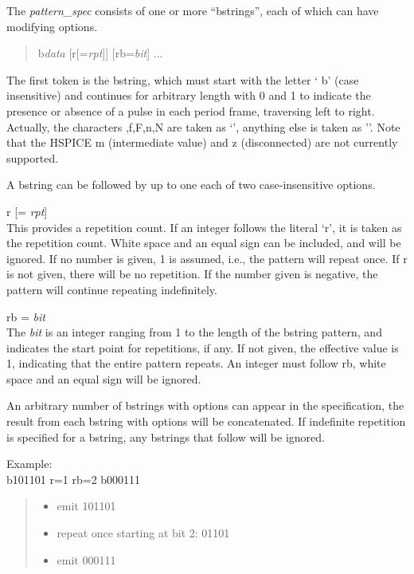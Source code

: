 The {\it pattern\_spec} consists of one or more ``bstrings'', each of
which can have modifying options.

\begin{quote}
{\vt b}{\it data} [{\vt r}[{\vt =}{\it rpt\/}]] [{\vt rb}{\vt =}{\it bit\/}] ...
\end{quote}

The first token is the bstring, which must start with the letter `{\vt
b}' (case insensitive) and continues for arbitrary length with 0 and 1
to indicate the presence or absence of a pulse in each period frame,
traversing left to right.  Actually, the characters {,f,F,n,N}
are taken as `{}', anything else is taken as '{}'.  Note
that the HSPICE {\vt m} (intermediate value) and {\vt z}
(disconnected) are not currently supported.

A bstring can be followed by up to one each of two case-insensitive
options.
\begin{description}
\item{\vt r} [{\vt =} {\it rpt\/}]\\
This provides a repetition count.  If an integer follows the literal
`{\vt r}', it is taken as the repetition count.  White space and an
equal sign can be included, and will be ignored.  If no number is
given, 1 is assumed, i.e., the pattern will repeat once.  If {\vt r}
is not given, there will be no repetition.  If the number given is
negative, the pattern will continue repeating indefinitely.

\item{rb} {\vt =} {\it bit\/}\\
The {\it bit} is an integer ranging from 1 to the length of the
bstring pattern, and indicates the start point for repetitions, if
any.  If not given, the effective value is 1, indicating that the
entire pattern repeats.  An integer must follow {\vt rb}, white space
and an equal sign will be ignored.
\end{description}

An arbitrary number of bstrings with options can appear in the
specification, the result from each bstring with options will be
concatenated.  If indefinite repetition is specified for a bstring,
any bstrings that follow will be ignored.

Example:\\
{\vt b101101 r=1 rb=2 b000111}
\begin{quote}
\begin{itemize}
\item{emit 101101}
\item{repeat once starting at bit 2: 01101}
\item{emit 000111}
\end{itemize}
\end{quote}

